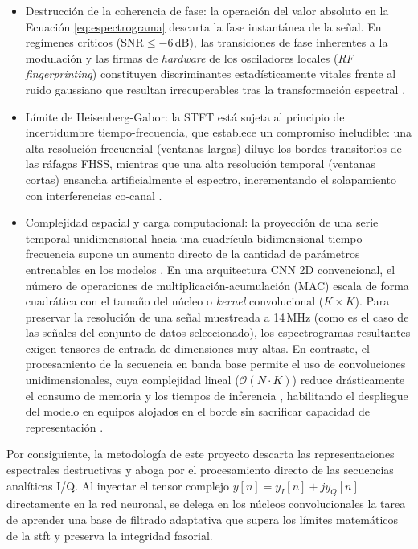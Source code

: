 \begin{itemize}
    \item Destrucción de la coherencia de fase: la operación del valor absoluto en la Ecuación \ref{eq:espectrograma} descarta la fase instantánea de la señal. En regímenes críticos ($\text{SNR} \le -6$\,dB), las transiciones de fase inherentes a la modulación y las firmas de \textit{hardware} de los osciladores locales (\textit{RF fingerprinting}) constituyen discriminantes estadísticamente vitales frente al ruido gaussiano que resultan irrecuperables tras la transformación espectral \cite{zheng_deep_2025}.
    \item Límite de Heisenberg-Gabor: la STFT está sujeta al principio de incertidumbre tiempo-frecuencia, que establece un compromiso ineludible: una alta resolución frecuencial (ventanas largas) diluye los bordes transitorios de las ráfagas FHSS, mientras que una alta resolución temporal (ventanas cortas) ensancha artificialmente el espectro, incrementando el solapamiento con interferencias co-canal \cite{oppenheim_discrete_2014}.
    \item Complejidad espacial y carga computacional: la proyección de una serie temporal unidimensional hacia una cuadrícula bidimensional tiempo-frecuencia supone un aumento directo de la cantidad de parámetros entrenables en los modelos \cite{alam_rf-enabled_2023}. En una arquitectura CNN 2D convencional, el número de operaciones de multiplicación-acumulación (MAC) escala de forma cuadrática con el tamaño del núcleo o \textit{kernel} convolucional ($K \times K$). Para preservar la resolución de una señal muestreada a 14\,MHz (como es el caso de las señales del conjunto de datos seleccionado), los espectrogramas resultantes exigen tensores de entrada de dimensiones muy altas. En contraste, el procesamiento de la secuencia en banda base permite el uso de convoluciones unidimensionales, cuya complejidad lineal ($\mathcal{O}(N \cdot K)$) reduce drásticamente el consumo de memoria y los tiempos de inferencia \cite{zheng_deep_2025}, habilitando el despliegue del modelo en equipos alojados en el borde sin sacrificar capacidad de representación \cite{cai_toward_2024, zhang_edge_2023}.
\end{itemize}

Por consiguiente, la metodología de este proyecto descarta las representaciones espectrales destructivas y aboga por el procesamiento directo de las secuencias analíticas I/Q. Al inyectar el tensor complejo $y[n] = y_I[n] + j y_Q[n]$ directamente en la red neuronal, se delega en los núcleos convolucionales la tarea de aprender una base de filtrado adaptativa que supera los límites matemáticos de la \gls{stft} y preserva la integridad fasorial.

